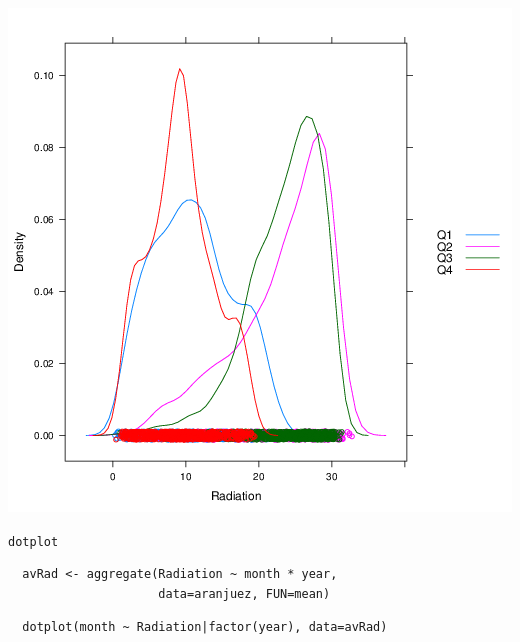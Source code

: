 \documentclass[xcolor={usenames,svgnames,dvipsnames}]{beamer}
\begin{document}
\begin{frame}[label={sec:orgheadline54}]{}
\includegraphics[width=.9\linewidth]{figs/density.png}
\end{frame}

\begin{frame}[fragile,label={sec:orgheadline55}]{\texttt{dotplot}}
 \lstset{language=R,label= ,caption= ,captionpos=b,numbers=none}
\begin{lstlisting}
  avRad <- aggregate(Radiation ~ month * year,
                     data=aranjuez, FUN=mean)
\end{lstlisting}

\lstset{language=R,label= ,caption= ,captionpos=b,numbers=none}
\begin{lstlisting}
  dotplot(month ~ Radiation|factor(year), data=avRad)
\end{lstlisting}
\end{frame}
\end{document}

